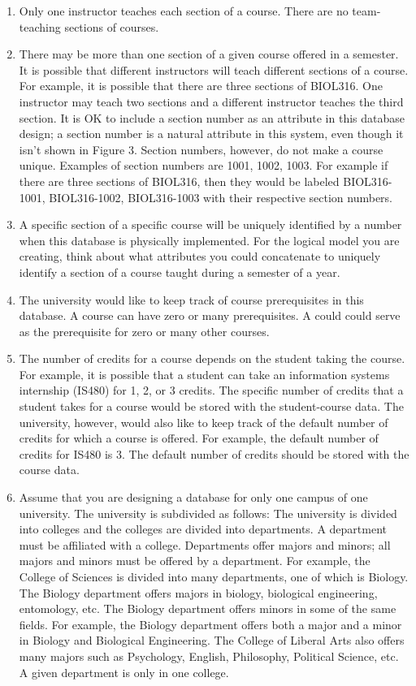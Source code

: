 \documentclass{article}
\begin{document}
\begin{enumerate}
  \item Only one instructor teaches each section of a course. There are no team-teaching sections of courses.
  
  \item There may be more than one section of a given course offered in a semester. It is possible that different instructors will teach different sections of a course. For example, it is possible that there are three sections of BIOL316. One instructor may teach two sections and a different instructor teaches the third section. It is OK to include a section number as an attribute in this database design; a section number is a natural attribute in this system, even though it isn’t shown in Figure 3. Section numbers, however, do not make a course unique. Examples of section numbers are 1001, 1002, 1003. For example if there are three sections of BIOL316, then they would be labeled BIOL316-1001, BIOL316-1002, BIOL316-1003 with their respective section numbers.
  
  \item A specific section of a specific course will be uniquely identified by a number when this database is physically implemented. For the logical model you are creating, think about what attributes you could concatenate to uniquely identify a section of a course taught during a semester of a year.
  
  \item The university would like to keep track of course prerequisites in this database. A course can have zero or many prerequisites. A could could serve as the prerequisite for zero or many other courses.
  
  \item The number of credits for a course depends on the student taking the course. For example, it is possible that a student can take an information systems internship (IS480) for 1, 2, or 3 credits. The specific number of credits that a student takes for a course would be stored with the student-course data. The university, however, would also like to keep track of the default number of credits for which a course is offered. For example, the default number of credits for IS480 is 3. The default number of credits should be stored with the course data.
  
  \item Assume that you are designing a database for only one campus of one university. The university is subdivided as follows: The university is divided into colleges and the colleges are divided into departments. A department must be affiliated with a college. Departments offer majors and minors; all majors and minors must be offered by a department. For example, the College of Sciences is divided into many departments, one of which is Biology. The Biology department offers majors in biology, biological engineering, entomology, etc. The Biology department offers minors in some of the same fields. For example, the Biology department offers both a major and a minor in Biology and Biological Engineering. The College of Liberal Arts also offers many majors such as Psychology, English, Philosophy, Political Science, etc. A given department is only in one college.
  

\end{enumerate}
\end{document}
